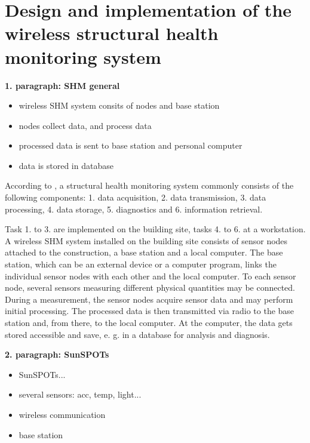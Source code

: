 \documentclass[12pt]{scrartcl}
\begin{document}

\section*{Design and implementation of the wireless structural health monitoring system}

\textbf{1. paragraph: SHM general}

\begin{itemize}
\item wireless SHM system consits of nodes and base station
\item nodes collect data, and process data
\item processed data is sent to base station and personal computer
\item data is stored in database
\end{itemize}


According to \cite[5]{BisbySHM}, a structural health monitoring system commonly consists of the following components:
1. data acquisition,
2. data transmission, 
3. data processing,
4. data storage,
5. diagnostics and 
6. information retrieval.

Task 1. to 3. are implemented on the building site, tasks 4. to 6. at a workstation. 
A wireless SHM system installed on the building site consists of sensor nodes attached to the construction, a base station and a local computer. 
The base station, which can be an external device or a computer program, links the individual sensor nodes with each other and the local computer.
To each sensor node, several sensors measuring different physical quantities may be connected. 
During a measurement, the sensor nodes acquire sensor data and may perform initial processing.
The processed data is then transmitted via radio to the base station and, from there, to the local computer. 
At the computer, the data gets stored accessible and save, e. g. in a database for analysis and diagnosis.



\textbf{2. paragraph: SunSPOTs}

\begin{itemize}
\item SunSPOTs...
\item several sensors: acc, temp, light...
\item wireless communication
\item base station
\end{itemize}
\end{document}
